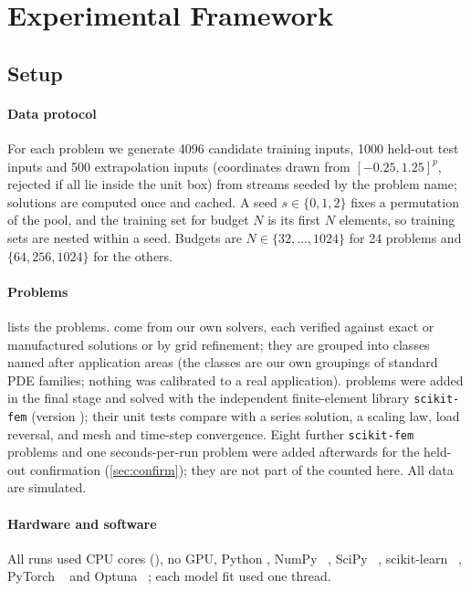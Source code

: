 \section{Experimental Framework}\label{sec:setup}
\subsection{Setup}
\paragraph{Data protocol} For each problem we generate 4096 candidate training inputs, 1000 held-out test inputs and 500 extrapolation inputs (coordinates drawn from $[-0.25,1.25]^p$, rejected if all lie inside the unit box) from streams seeded by the problem name; solutions are computed once and cached. A seed $s\in\{0,1,2\}$ fixes a permutation of the pool, and the training set for budget $N$ is its first $N$ elements, so training sets are nested within a seed. Budgets are $N\in\{32,\dots,1024\}$ for 24 problems and $\{64,256,1024\}$ for the others.
\paragraph{Problems}  lists the \NAllProblems{} problems. \NOwnProblems{} come from our own solvers, each verified against exact or manufactured solutions or by grid refinement; they are grouped into \NClassesOwn{} classes named after application areas (the classes are our own groupings of standard PDE families; nothing was calibrated to a real application). \NTpProblems{} problems were added in the final stage and solved with the independent finite-element library \texttt{scikit-fem} (version \VerSkfem); their unit tests compare with a series solution, a scaling law, load reversal, and mesh and time-step convergence. Eight further \texttt{scikit-fem} problems and one seconds-per-run problem were added afterwards for the held-out confirmation (\cref{sec:confirm}); they are not part of the \NAllProblems{} counted here. All data are simulated.
\begin{table}[t]\centering\caption{The \NAllProblems{} test problems by class. ``Inputs'' is the number of parameters $p$, ``Outputs'' the number of field values $m$.}\label{tab:problems}\small\resizebox{\textwidth}{!}{}\end{table}
\paragraph{Hardware and software} All runs used \HwCores{} CPU cores (\HwCpu), no GPU, Python \VerPython, NumPy \VerNumpy~\cite{harris2020}, SciPy \VerScipy~\cite{virtanen2020}, scikit-learn \VerSklearn~\cite{pedregosa2011}, PyTorch \VerTorch~\cite{paszke2019} and Optuna \VerOptuna~\cite{akiba2019}; each model fit used one thread.

